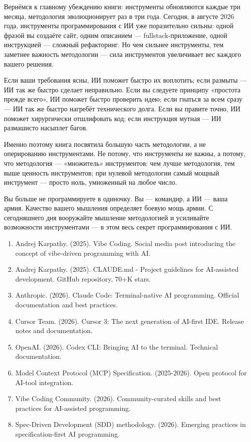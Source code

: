 Вернёмся к главному убеждению книги: инструменты обновляются каждые три месяца, методология эволюционирует раз в три года. Сегодня, в августе 2026 года, инструменты программирования с ИИ уже поразительно сильны: одной фразой вы создаёте сайт, одним описанием — fullstack-приложение, одной инструкцией — сложный рефакторинг. Но чем сильнее инструменты, тем заметнее важность методологии — сила инструментов увеличивает вес каждого вашего решения.

Если ваши требования ясны, ИИ поможет быстро их воплотить; если размыты — ИИ так же быстро сделает неправильно. Если вы следуете принципу «простота прежде всего», ИИ поможет быстро проверить идею; если гнаться за всем сразу — ИИ так же быстро нагребёт технического долга. Если вы правите точно, ИИ поможет хирургически отшлифовать код; если инструкция мутная — ИИ размашисто насыплет багов.

Именно поэтому книга посвятила большую часть методологии, а не оперированию инструментами. Не потому, что инструменты не важны, а потому, что методология — «множитель» инструментов: чем лучше методология, тем выше ценность инструментов; при нулевой методологии самый мощный инструмент — просто ноль, умноженный на любое число.

Вы больше не программируете в одиночку. Вы — командир, а ИИ — ваша армия. Качество вашего мышления определяет боевую мощь армии. С сегодняшнего дня вооружайте мышление методологией и усиливайте возможности инструментами — в этом весь секрет программирования с ИИ.


\begin{enumerate}
  \item Andrej Karpathy. (2025). Vibe Coding. Social media post introducing the concept of vibe-driven programming with AI.
  \item Andrej Karpathy. (2025). CLAUDE.md - Project guidelines for AI-assisted development. GitHub repository, 70+K stars.
  \item Anthropic. (2026). Claude Code: Terminal-native AI programming. Official documentation and best practices.
  \item Cursor Team. (2026). Cursor 3: The next generation of AI-first IDE. Release notes and documentation.
  \item OpenAI. (2026). Codex CLI: Bringing AI to the terminal. Technical documentation.
  \item Model Context Protocol (MCP) Specification. (2025-2026). Open protocol for AI-tool integration.
  \item Vibe Coding Community. (2026). Community-curated skills and best practices for AI-assisted programming.
  \item Spec-Driven Development (SDD) methodology. (2026). Emerging practices in specification-first AI programming.
\end{enumerate}
